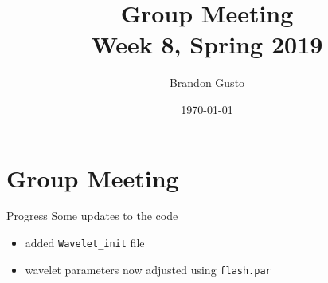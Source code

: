 \documentclass{beamer}
\newcommand{\weeknum}{8}
\begin{document}
\section{Group Meeting}
\title{Group Meeting \\ Week \weeknum, Spring 2019}
\author{Brandon Gusto} %
\date{\today}
\frame{\titlepage}

\begin{frame}{Progress}
  Some updates to the code
  \begin{itemize}
    \item added \texttt{Wavelet_init} file
    \item wavelet parameters now adjusted using \texttt{flash.par}
  \end{itemize}
\end{frame}
\end{document}
